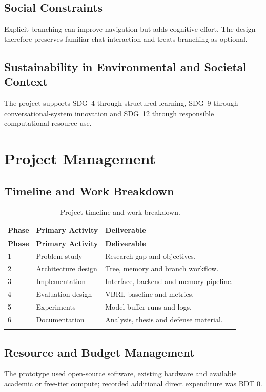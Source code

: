 \subsection{Social Constraints}
Explicit branching can improve navigation but adds cognitive effort. The design therefore preserves familiar chat interaction and treats branching as optional.

\subsection{Sustainability in Environmental and Societal Context}
The project supports SDG~4 through structured learning, SDG~9 through conversational-system innovation and SDG~12 through responsible computational-resource use.

\section{Project Management}

\subsection{Timeline and Work Breakdown}
\begin{longtable}{p{}p{}p{}}
\caption{Project timeline and work breakdown.}\label{tab:annexA_timeline}\\
\toprule
\textbf{Phase} & \textbf{Primary Activity} & \textbf{Deliverable} \\
\midrule
\endfirsthead
\toprule
\textbf{Phase} & \textbf{Primary Activity} & \textbf{Deliverable} \\
\midrule
\endhead
1 & Problem study & Research gap and objectives. \\
2 & Architecture design & Tree, memory and branch workflow. \\
3 & Implementation & Interface, backend and memory pipeline. \\
4 & Evaluation design & VBRI, baseline and metrics. \\
5 & Experiments & Model-buffer runs and logs. \\
6 & Documentation & Analysis, thesis and defense material. \\
\botrule
\end{longtable}

\subsection{Resource and Budget Management}
The prototype used open-source software, existing hardware and available academic or free-tier compute; recorded additional direct expenditure was BDT 0.

